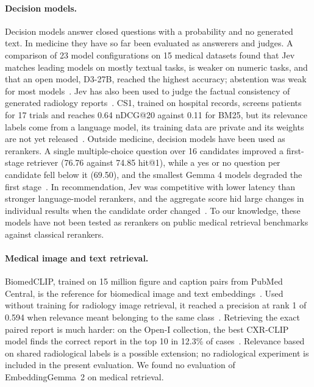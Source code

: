 \documentclass{article}
\begin{document}
\paragraph{Decision models.} Decision models answer closed questions with a probability and no generated text. In medicine they have so far been evaluated as answerers and judges. A comparison of 23 model configurations on 15 medical datasets found that Jev matches leading models on mostly textual tasks, is weaker on numeric tasks, and that an open model, D3-27B, reached the highest accuracy; abstention was weak for most models~\citep{du2026reliable}. Jev has also been used to judge the factual consistency of generated radiology reports~\citep{huang2026jevradiology}. CS1, trained on hospital records, screens patients for 17 trials and reaches 0.64 nDCG@20 against 0.11 for BM25, but its relevance labels come from a language model, its training data are private and its weights are not yet released~\citep{zhang2026cs1}. Outside medicine, decision models have been used as rerankers. A single multiple-choice question over 16 candidates improved a first-stage retriever (76.76 against 74.85 hit@1), while a yes or no question per candidate fell below it (69.50), and the smallest Gemma 4 models degraded the first stage~\citep{liu2026multimodalrerank}. In recommendation, Jev was competitive with lower latency than stronger language-model rerankers, and the aggregate score hid large changes in individual results when the candidate order changed~\citep{lyu2026decisionrerank}. To our knowledge, these models have not been tested as rerankers on public medical retrieval benchmarks against classical rerankers.

\paragraph{Medical image and text retrieval.} BiomedCLIP, trained on 15 million figure and caption pairs from PubMed Central, is the reference for biomedical image and text embeddings~\citep{zhang2023biomedclip}. Used without training for radiology image retrieval, it reached a precision at rank 1 of 0.594 when relevance meant belonging to the same class~\citep{denner2025cbir}. Retrieving the exact paired report is much harder: on the Open-I collection, the best CXR-CLIP model finds the correct report in the top 10 in 12.3\% of cases~\citep{you2023cxrclip}. Relevance based on shared radiological labels is a possible extension; no radiological experiment is included in the present evaluation. We found no evaluation of EmbeddingGemma~2 on medical retrieval.
\end{document}
